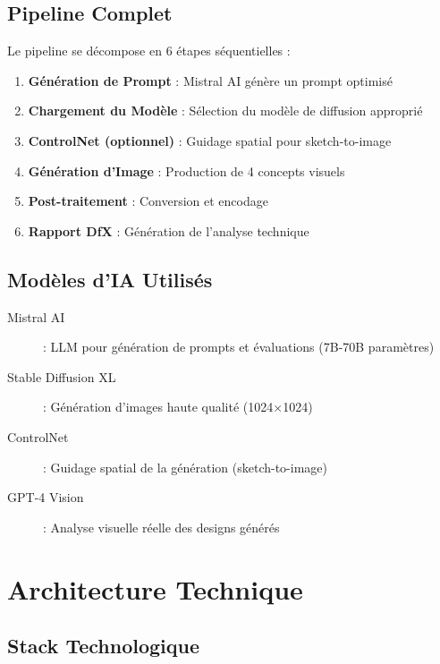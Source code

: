 \documentclass[12pt,a4paper]{article}
\begin{document}
\subsection{Pipeline Complet}

Le pipeline se décompose en 6 étapes séquentielles :

\begin{enumerate}
    \item \textbf{Génération de Prompt} : Mistral AI génère un prompt optimisé
    \item \textbf{Chargement du Modèle} : Sélection du modèle de diffusion approprié
    \item \textbf{ControlNet (optionnel)} : Guidage spatial pour sketch-to-image
    \item \textbf{Génération d'Image} : Production de 4 concepts visuels
    \item \textbf{Post-traitement} : Conversion et encodage
    \item \textbf{Rapport DfX} : Génération de l'analyse technique
\end{enumerate}

\subsection{Modèles d'IA Utilisés}

\begin{description}
    \item[Mistral AI] : LLM pour génération de prompts et évaluations (7B-70B paramètres)
    \item[Stable Diffusion XL] : Génération d'images haute qualité (1024×1024)
    \item[ControlNet] : Guidage spatial de la génération (sketch-to-image)
    \item[GPT-4 Vision] : Analyse visuelle réelle des designs générés
\end{description}

\section{Architecture Technique}

\subsection{Stack Technologique}
\end{document}
